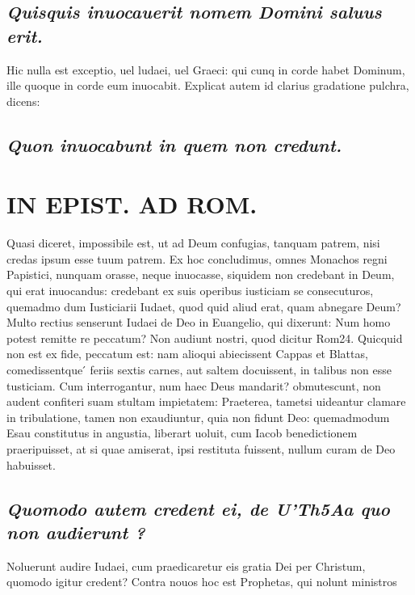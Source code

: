 \documentclass{article}
\begin{document}
\begin{pages}
\subsection*{\textit{Quisquis inuocauerit nomem Domini saluus erit. }}\pstart Hic nulla est exceptio, uel ludaei, uel Graeci: qui cunq in corde habet Dominum, ille quoque in corde eum inuocabit. Explicat autem id clarius gradatione pulchra, dicens:  \pend
{}
{}
\subsection*{\textit{Quon inuocabunt in quem non credunt. }}
\section*{IN EPIST. AD ROM.  }
\marginpar{[ p.121 ]}\pstart Quasi diceret, impossibile est, ut ad Deum confugias, tanquam patrem, nisi credas ipsum esse tuum patrem. Ex hoc concludimus, omnes Monachos regni Papistici, nunquam orasse, neque inuocasse, siquidem non credebant in Deum, qui erat inuocandus: credebant ex suis operibus iusticiam se consecuturos, quemadmo dum Iusticiarii Iudaet, quod quid aliud erat, quam abnegare Deum? Multo rectius senserunt Iudaei de Deo in Euangelio, qui dixerunt: Num homo potest remitte re peccatum? Non audiunt nostri, quod dicitur Rom24. Quicquid non est ex fide, peccatum est: nam alioqui abiecissent Cappas et Blattas, comedissentque ́ feriis sextis carnes, aut saltem docuissent, in talibus non esse tusticiam. Cum interrogantur, num haec Deus mandarit? obmutescunt, non audent confiteri suam stultam impietatem: Praeterea, tametsi uideantur clamare in tribulatione, tamen non exaudiuntur, quia non fidunt Deo: quemadmodum Esau constitutus in angustia, liberart uoluit, cum Iacob benedictionem praeripuisset, at si quae amiserat, ipsi restituta fuissent, nullum curam de Deo habuisset.   \pend
{}
{}
\subsection*{\textit{Quomodo autem credent ei, de U'Th5Aa quo non audierunt ? }}\pstart Noluerunt audire Iudaei, cum praedicaretur eis gratia Dei per Christum, quomodo igitur credent? Contra nouos hoc est Prophetas, qui nolunt ministros  \pend
{}
{}

\end{pages}
\end{document}
